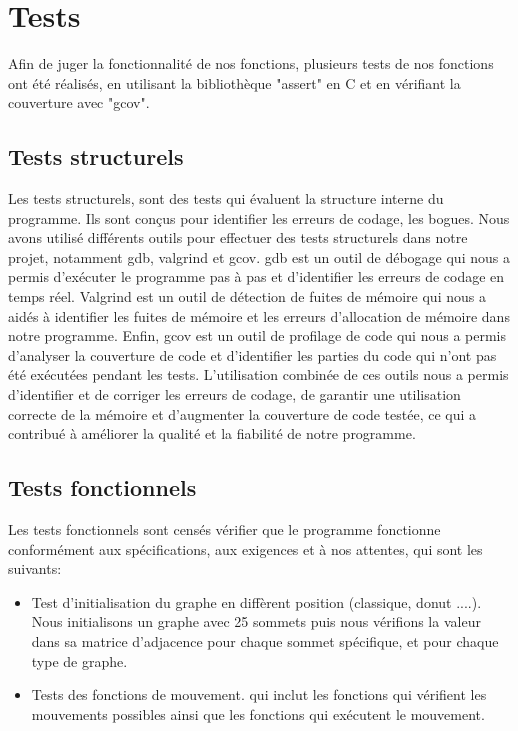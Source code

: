 \documentclass[11pt]{article}
\begin{document}
    \section{Tests}
    Afin de juger la fonctionnalité de nos fonctions, plusieurs tests de nos fonctions ont été réalisés, en utilisant la bibliothèque "assert" en C et en vérifiant la couverture avec "gcov".\\
    
        \subsection{Tests structurels}
Les tests structurels, sont des tests qui évaluent la structure interne du programme. Ils sont conçus pour identifier les erreurs de codage, les bogues. Nous avons utilisé différents outils pour effectuer des tests structurels dans notre projet, notamment gdb, valgrind et gcov. gdb est un outil de débogage qui nous a permis d'exécuter le programme pas à pas et d'identifier les erreurs de codage en temps réel. Valgrind est un outil de détection de fuites de mémoire qui nous a aidés à identifier les fuites de mémoire et les erreurs d'allocation de mémoire dans notre programme. Enfin, gcov est un outil de profilage de code qui nous a permis d'analyser la couverture de code et d'identifier les parties du code qui n'ont pas été exécutées pendant les tests. L'utilisation combinée de ces outils nous a permis d'identifier et de corriger les erreurs de codage, de garantir une utilisation correcte de la mémoire et d'augmenter la couverture de code testée, ce qui a contribué à améliorer la qualité et la fiabilité de notre programme.
        \subsection{Tests fonctionnels}
        Les tests fonctionnels sont censés vérifier que le programme fonctionne conformément aux spécifications, aux exigences et à nos attentes, qui sont les suivants: 
        \begin{itemize}
    \item Test d'initialisation du graphe en diffèrent position (classique, donut ....). Nous initialisons un graphe avec 25 sommets puis nous vérifions la valeur dans sa matrice d'adjacence pour chaque sommet spécifique, et pour chaque type de graphe. 
    \item  Tests des fonctions de mouvement.
qui inclut les fonctions qui vérifient les mouvements possibles ainsi que les fonctions qui exécutent le mouvement.
\end{itemize}
\end{document}
